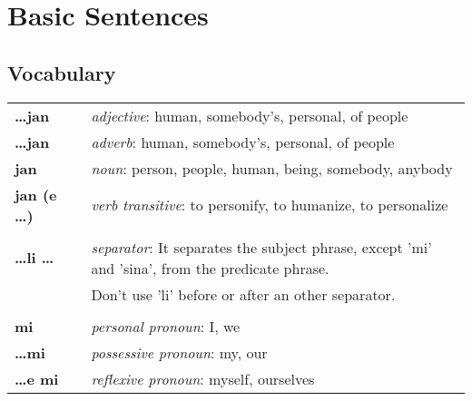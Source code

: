 \section{Basic Sentences}
\subsection*{Vocabulary}
%
\begin{supertabular}{p{2,5cm}|ll}
    \textbf{\dots jan}      &  & \textit{adjective}: human, somebody's, personal, of people                                              \\ %
    \textbf{\dots jan}      &  & \textit{adverb}: human, somebody's, personal, of people                                                 \\ %
    \textbf{jan}            &  & \textit{noun}: person, people, human, being, somebody, anybody                                          \\ %
    \textbf{jan (e \dots)}  &  & \textit{verb transitive}: to personify, to humanize, to personalize                                     \\ %
                            &  &                                                                                                         \\ %
    \textbf{\dots li \dots} &  & \textit{separator}: It separates the subject phrase, except 'mi' and 'sina', from the predicate phrase. \\ && Don't use 'li' before or after an other separator. \\ %
                            &  &                                                                                                         \\ %
    \textbf{mi}             &  & \textit{personal pronoun}: I, we                                                                        \\
    \textbf{\dots mi}       &  & \textit{possessive pronoun}: my, our                                                                    \\
    \textbf{\dots e mi}     &  & \textit{reflexive pronoun}: myself, ourselves                                                           \\

\end{supertabular}
